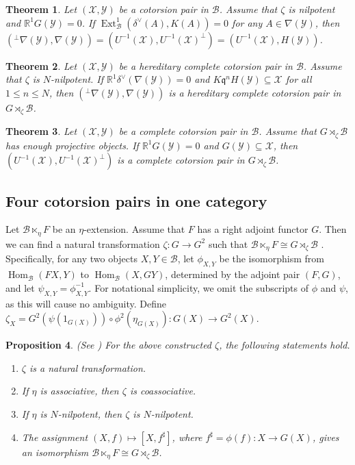 \documentclass[11pt,reqno]{amsart}
\numberwithin{equation}{section}
\newtheorem{theorem}{Theorem}[section]
\newtheorem{proposition}[theorem]{Proposition}
\newcommand{\cB}{\mathcal B}
\newcommand{\cX}{\mathcal X}
\newcommand{\cY}{\mathcal Y}
\newcommand{\Ext}{\operatorname{Ext}}
\newcommand{\Hom}{\operatorname{Hom}}
\newcommand{\coradf}{\mathfrak q}
\begin{document}
\begin{theorem}\label{thm:cotwo-equal}
Let $(\cX,\cY)$ be a cotorsion pair in $\cB$. Assume that $\zeta$ is nilpotent and $\mathbb{R}^1G(\cY)=0$. If $\Ext^1_{\cB}(\delta^\vee(A),K(A))=0$ for any $A\in \nabla(\cY)$, then
$({}^\perp\nabla(\cY),\nabla(\cY))=(U^{-1}(\cX),U^{-1}(\cX)^\perp)=(U^{-1}(\cX),H(\cY))$.
\end{theorem}


\begin{theorem}\label{thm:cocompleteness}
Let $(\cX,\cY)$ be a hereditary complete cotorsion pair in $\cB$. Assume that $\zeta$ is $N$-nilpotent. If $\mathbb{R}^1\delta^\vee(\nabla(\cY))=0$ and $K\coradf^nH(\cY)\subseteq \cX$ for all $1\leq n\leq N$, then $({}^\perp\nabla(\cY),\nabla(\cY))$ is
a hereditary complete cotorsion pair in $G\rtimes_\zeta \cB$.
\end{theorem}

\begin{theorem}\label{thm:U-cocompleteness}
Let $(\cX,\cY)$ be a complete cotorsion pair in $\cB$. Assume that $G\rtimes_\zeta \cB$ has enough projective objects. If $\mathbb{R}^1G(\cY)=0$ and $G(\cY)\subseteq \cX$, then $(U^{-1}(\cX),U^{-1}(\cX)^\perp)$ is
a complete cotorsion pair in $G\rtimes_\zeta \cB$.
\end{theorem}


\subsection{Four cotorsion pairs in one category} Let $\cB\ltimes_\eta F$ be an $\eta$-extension. Assume that $F$ has a right adjoint functor $G$.
Then we can find a natural transformation $\zeta\colon G\to G^2$ such that $\cB\ltimes_\eta F\cong G\rtimes_\zeta \cB$ \cite[Proposition 4.2]{Marmaridis}.
Specifically, for any
two objects $X,Y\in \cB$, let $\phi_{X,Y}$ be the isomorphism from $\Hom_{\cB}(FX,Y)$ to $\Hom_{\cB}(X,GY)$, determined by the adjoint pair $(F,G)$, and let
$\psi_{X,Y}=\phi_{X,Y}^{-1}$. For notational simplicity, we omit the subscripts of $\phi$ and $\psi$, as this will cause no ambiguity. Define
$\zeta_X=G^2(\psi(1_{G(X)}))\circ \phi^2(\eta_{G(X)})\colon G(X)\to G^2(X)$.

\begin{proposition}
{\rm (See \cite[Section 4]{Marmaridis})}
For the above constructed $\zeta$, the following statements hold.
\begin{enumerate}[label=\textup{(\arabic*)}]
\item $\zeta$ is a natural transformation.
\item If $\eta$ is associative, then $\zeta$ is coassociative.
\item If $\eta$ is $N$-nilpotent, then $\zeta$ is $N$-nilpotent.
\item The assignment $(X,f)\mapsto [X,f^{\sharp}]$, where $f^{\sharp}=\phi(f)\colon X\to G(X)$, gives an isomorphism $\cB\ltimes_\eta F\cong G\rtimes_\zeta \cB$.
\end{enumerate}
\end{proposition}
\end{document}
